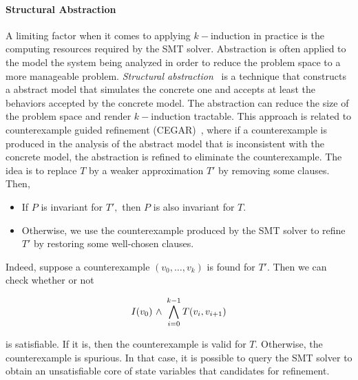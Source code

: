 \paragraph{Structural Abstraction}
A limiting factor when it comes to applying $k-$induction in practice
is the computing resources required by the SMT solver. Abstraction is
often applied to the model the system being analyzed in order to
reduce the problem space to a more manageable problem.  {\em
  Structural abstraction}~\cite{ bh07structural} is a technique that
constructs a abstract model that simulates the concrete one and
accepts at least the behaviors accepted by the concrete model. The
abstraction can reduce the size of the problem
space and render $k-$induction tractable. This
approach is  
related to counterexample guided refinement
(CEGAR)~\cite{Clarke2003CAR}, where if a counterexample is produced in
the analysis of the abstract model that is inconsistent with the
concrete model, the abstraction is refined to eliminate the
counterexample. The idea is to replace $T$
by a weaker approximation $T'$ by removing some clauses. Then, 
\begin{itemize}
\item If $P$ is invariant for $T',$ then $P$ is also invariant for $T.$
\item Otherwise, we use the counterexample produced by the SMT solver
  to refine $T'$ by restoring some well-chosen clauses.
\end{itemize}  
Indeed, suppose a counterexample $(v_0,\ldots, v_k)$ is found for $T'$. Then we can
check whether or not

$$ I(v_0)
{\ \wedge \ } \bigwedge_{i=0}^{k-1} T(v_i,v_{i+1})$$ 


is satisfiable.  If it is, then the counterexample is valid for $T$.
Otherwise, the counterexample is spurious. In that case, it is possible to query
the SMT solver to obtain an unsatisfiable core of state variables that
candidates for refinement.









